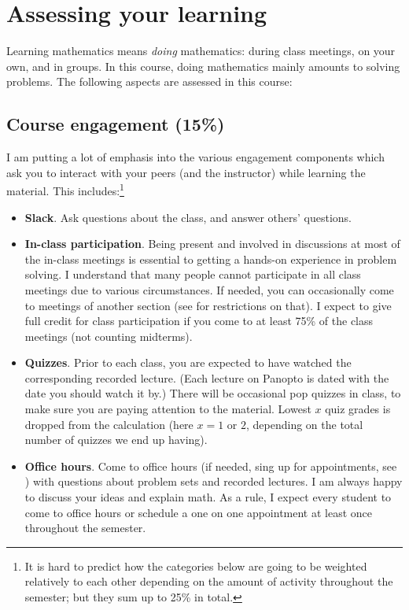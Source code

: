 \documentclass[oneside,11pt]{amsart}
\begin{document}
\section{Assessing your learning}

Learning mathematics means \emph{doing} mathematics: during class meetings, on your own, and in groups.
In this course, doing mathematics mainly amounts to solving problems.
The following aspects are assessed in this course:

\subsection{Course engagement (15\%)}

I am putting a lot of emphasis
into the various engagement components which ask you to interact with 
your peers (and the instructor) while learning the material. This includes:\footnote{It is 
hard to predict how the categories below are going to be weighted relatively to each other
depending on the amount of activity throughout the semester; but they sum up to 25\% in total.}

\begin{itemize}
	\item \textbf{Slack}. Ask questions about the class, and answer others' questions.
	\item \textbf{In-class participation}. 
		Being present and involved in discussions at most of the in-class meetings
		is essential to getting a hands-on experience 
		in problem solving. 
		I understand that many people cannot participate in all class meetings due to various
		circumstances. 
		If needed,
		you can occasionally come to meetings of another section (see 
		for restrictions on that).
		I expect to give full credit for class participation 
		if you come to at least 75\% of the class meetings (not counting midterms).
	\item \textbf{Quizzes}. 
		Prior to each class, you are expected to have watched the corresponding recorded lecture.
		(Each lecture on Panopto is dated with the date you should watch it by.)
		There will be occasional pop quizzes in class,
		to make sure you are paying attention to the material. 
		Lowest $x$ quiz grades is dropped from the calculation (here $x=1$ or $2$, depending
		on the total number of quizzes we end up having).
	\item \textbf{Office hours}. Come to office hours (if needed, 
		sing up for appointments, see ) 
		with questions about problem sets and recorded lectures.
		I am always happy to discuss your ideas and explain math.
		As a rule, I expect every student to come to office hours or schedule a one on one appointment
		at least once throughout the semester.
\end{itemize}
\end{document}
